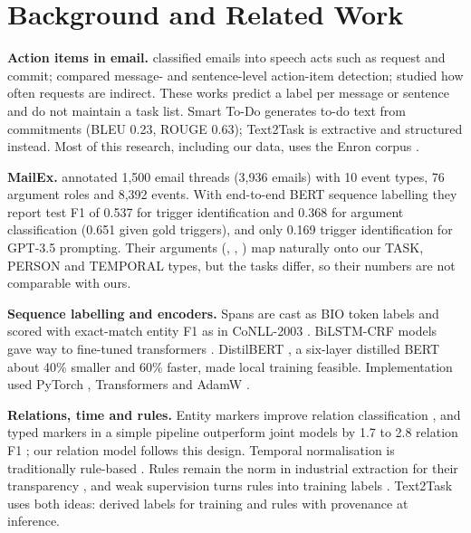 \chapter{Background and Related Work}
\label{ch:background}

\textbf{Action items in email.} \citet{cohen2004speechacts} classified emails into speech acts such as request and commit; \citet{bennett2005actionitems} compared message- and sentence-level action-item detection; \citet{lampert2010requests} studied how often requests are indirect. These works predict a label per message or sentence and do not maintain a task list. Smart To-Do \citep{mukherjee2020smarttodo} generates to-do text from commitments (BLEU 0.23, ROUGE 0.63); Text2Task is extractive and structured instead. Most of this research, including our data, uses the Enron corpus \citep{klimt2004enron}.

\textbf{MailEx.} \citet{srivastava2023mailex} annotated 1,500 email threads (3,936 emails) with 10 event types, 76 argument roles and 8,392 events. With end-to-end BERT sequence labelling they report test F1 of 0.537 for trigger identification and 0.368 for argument classification (0.651 given gold triggers), and only 0.169 trigger identification for GPT-3.5 prompting. Their arguments (, , ) map naturally onto our TASK, PERSON and TEMPORAL types, but the tasks differ, so their numbers are not comparable with ours.

\textbf{Sequence labelling and encoders.} Spans are cast as BIO token labels \citep{ramshaw1995chunking} and scored with exact-match entity F1 as in CoNLL-2003 \citep{tjongkimsang2003conll,nakayama2018seqeval}. BiLSTM-CRF models \citep{lample2016ner} gave way to fine-tuned transformers \citep{vaswani2017attention,devlin2019bert}. DistilBERT \citep{sanh2019distilbert}, a six-layer distilled BERT about 40\% smaller and 60\% faster, made local training feasible. Implementation used PyTorch \citep{paszke2019pytorch}, Transformers \citep{wolf2020transformers} and AdamW \citep{loshchilov2019adamw}.

\textbf{Relations, time and rules.} Entity markers improve relation classification \citep{baldinisoares2019mtb}, and typed markers in a simple pipeline outperform joint models by 1.7 to 2.8 relation F1 \citep{zhong2021pure}; our relation model follows this design. Temporal normalisation is traditionally rule-based \citep{strotgen2010heideltime,chang2012sutime}. Rules remain the norm in industrial extraction for their transparency \citep{chiticariu2013rules}, and weak supervision turns rules into training labels \citep{ratner2017snorkel}. Text2Task uses both ideas: derived labels for training and rules with provenance at inference.


